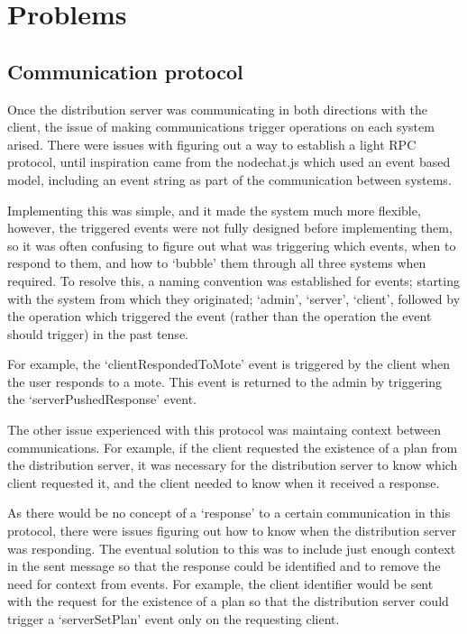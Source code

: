 \documentclass[a4papert,11pt,notitlepage]{article}
\begin{document}
\pagebreak
\section{Problems}
\subsection{Communication protocol}
Once the distribution server was communicating in both directions with the client, the issue of making communications trigger operations on each system arised. There were issues with figuring out a way to establish a light RPC\cite{rpc:web} protocol, until inspiration came from the nodechat.js\cite{nodechatjs:web} which used an event based model, including an event string as part of the communication between systems. 

Implementing this was simple, and it made the system much more flexible, however, the triggered events were not fully designed before implementing them, so it was often confusing to figure out what was triggering which events, when to respond to them, and how to `bubble' them through all three systems when required. To resolve this, a naming convention was established for events; starting with the system from which they originated; `admin', `server', `client', followed by the operation which triggered the event (rather than the operation the event should trigger) in the past tense. 

For example, the `clientRespondedToMote' event is triggered by the client when the user responds to a mote. This event is returned to the admin by triggering the `serverPushedResponse' event.

The other issue experienced with this protocol was maintaing context between communications. For example, if the client requested the existence of a plan from the distribution server, it was necessary for the distribution server to know which client requested it, and the client needed to know when it received a response. 

As there would be no concept of a `response' to a certain communication in this protocol, there were issues figuring out how to know when the distribution server was responding. The eventual solution to this was to include just enough context in the sent message so that the response could be identified and to remove the need for context from events. For example, the client identifier would be sent with the request for the existence of a plan so that the distribution server could trigger a `serverSetPlan' event only on the requesting client.
 
\end{document}
